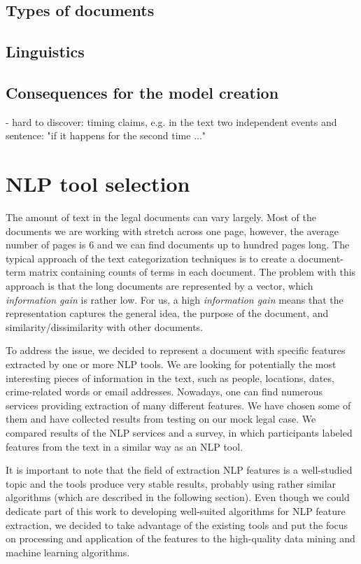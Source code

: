 \documentclass[
  digital, %
  table,   %
  lof,     %
  lot,     %
]{fithesis3}
\begin{document}
\section{Types of documents}
\section{Linguistics}
\section{Consequences for the model creation}
- hard to discover: timing claims, e.g. in the text two independent events and sentence: "if it happens for the second time ..." 

\chapter{NLP tool selection}
The amount of text in the legal documents can vary largely.
Most of the documents we are working with stretch across one page, however, the average number of pages is 6 and we can find documents up to hundred pages long.
The typical approach of the text categorization techniques is to create a document-term matrix containing counts of terms in each document.
The problem with this approach is that the long documents are represented by a vector, which \emph{information gain} is rather low.
For us, a high \emph{information gain} means that the representation captures the general idea, the purpose of the document, and similarity/dissimilarity with other documents.

To address the issue, we decided to represent a document with specific features extracted by one or more NLP tools.
We are looking for potentially the most interesting pieces of information in the text, such as people, locations, dates, crime-related words or email addresses.
Nowadays, one can find numerous services providing extraction of many different features.
We have chosen some of them and have collected results from testing on our mock legal case.
We compared results of the NLP services and a survey, in which participants labeled features from the text in a similar way as an NLP tool.

It is important to note that the field of extraction NLP features is a well-studied topic and the tools produce very stable results, probably using rather similar algorithms (which are described in the following section). Even though we could dedicate part of this work to developing well-suited algorithms for NLP feature extraction, we decided to take advantage of the existing tools and put the focus on processing and application of the features to the high-quality data mining and machine learning algorithms. 
\end{document}
